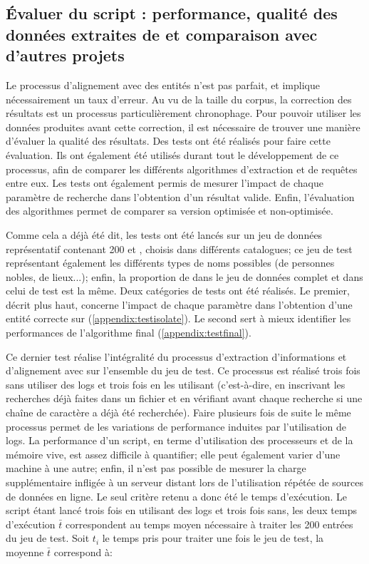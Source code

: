 \subsection{Évaluer du script : performance, qualité des données extraites de \wkd{} et comparaison avec d'autres projets}
Le processus d'alignement avec des entités \wkd{} n'est pas parfait, et implique nécessairement un taux d'erreur. Au vu de la taille du corpus, la correction des résultats est un processus particulièrement chronophage. Pour pouvoir utiliser les données produites avant cette correction, il est nécessaire de trouver une manière d'évaluer la qualité des résultats. Des tests ont été réalisés pour faire cette évaluation. Ils ont également été utilisés durant tout le développement de ce processus, afin de comparer les différents algorithmes d'extraction et de requêtes entre eux. Les tests ont également permis de mesurer l'impact de chaque paramètre de recherche dans l'obtention d'un résultat valide. Enfin, l'évaluation des algorithmes permet de comparer sa version optimisée et non-optimisée.

Comme cela a déjà été dit, les tests ont été lancés sur un jeu de données représentatif contenant 200 \tname{} et \ttrait{}, choisis dans différents catalogues; ce jeu de test représentant également les différents types de noms possibles (de personnes nobles, de lieux...); enfin, la proportion de \ttrait{} dans le jeu de données complet et dans celui de test est la même. Deux catégories de tests ont été réalisés. Le premier, décrit plus haut, concerne l'impact de chaque paramètre dans l'obtention d'une entité correcte sur \wkd{} (\ref{appendix:testisolate}). Le second sert à mieux identifier les performances de l'algorithme final (\ref{appendix:testfinal}). 

Ce dernier test réalise l'intégralité du processus d'extraction d'informations et d'alignement avec \wkd{} sur l'ensemble du jeu de test. Ce processus est réalisé trois fois sans utiliser des \glspl{log} et trois fois en les utilisant (c'est-à-dire, en inscrivant les recherches déjà faites dans un fichier et en vérifiant avant chaque recherche si une chaîne de caractère a déjà été recherchée). Faire plusieurs fois de suite le même processus permet de les variations de performance induites par l'utilisation de \glspl{log}. La performance d'un script, en terme d'utilisation des processeurs et de la mémoire vive, est assez difficile à quantifier; elle peut également varier d'une machine à une autre; enfin, il n'est pas possible de mesurer la charge supplémentaire infligée à un serveur distant lors de l'utilisation répétée de sources de données en ligne. Le seul critère retenu a donc été le temps d'exécution. Le script étant lancé trois fois en utilisant des \glspl{log} et trois fois sans, les deux temps d'exécution \(\bar{t}\) correspondent au temps moyen nécessaire à traiter les 200 entrées du jeu de test. Soit \(t_i\) le temps pris pour traiter une fois le jeu de test, la moyenne \(\bar{t}\) correspond à:


